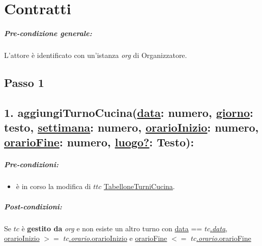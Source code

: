 \chapter{Contratti}
\paragraph{Pre-condizione generale:} L'attore è identificato con un'istanza \textit{org} di Organizzatore.

\section{Passo 1}
\section*{1. aggiungiTurnoCucina(\underline{data}: numero, \underline{giorno}: testo, \underline{settimana}: numero, \underline{orarioInizio}: numero, \underline{orarioFine}: numero, \underline{luogo?}: Testo):}

\paragraph{Pre-condizioni:} 
\begin{itemize}
 \item è in corso la modifica di $ttc$ \underline{TabelloneTurniCucina}.
\end{itemize}

\paragraph{Post-condizioni:} Se $tc$ è \textbf{gestito da} \textit{org} e non esiste un altro turno con \underline{data} == \underline{$tc$.\textit{data}}, \underline{orarioInizio} $>=$ \underline{$tc$.\textit{orario}.orarioInizio} e \underline{orarioFine} $<=$ \underline{$tc$.\textit{orario}.orarioFine}

